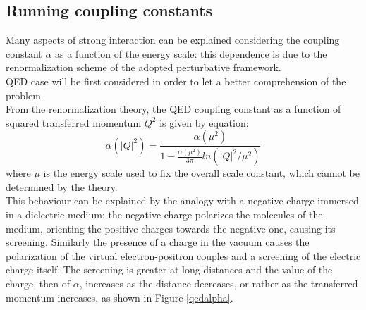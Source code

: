 \subsection{Running coupling constants}
Many aspects of strong interaction can be explained considering the coupling constant $\alpha$ as a function of the energy scale: this dependence is due to the renormalization scheme of the adopted perturbative framework.\\
QED case will be first considered in order to let a better comprehension of the problem.\\
From the renormalization theory, the QED coupling constant as a function of squared transferred momentum $Q^{2}$ is given by equation:
%
\begin{equation}
  \alpha(|Q|^{2})= \frac{ \alpha(\mu^{2})}{1-\frac{\alpha(\mu^{2})}{3\pi}ln(|Q|^{2} / \mu^{2})}
  \label{eq:aqed}
\end{equation}
%
where $\mu$ is the energy scale used to fix the overall scale constant, which cannot be determined by the theory.\\
This behaviour can be explained by the analogy with a negative charge immersed in a dielectric medium: the negative charge polarizes the molecules of the medium, orienting the positive charges towards the negative one, causing its screening. Similarly the presence of a charge in the vacuum causes the polarization of the virtual electron-positron couples and a screening of the electric charge itself. The screening is greater at long distances and the value of the charge, then of $\alpha$, increases as the distance decreases, or rather as the transferred momentum increases, as shown in Figure \ref{qedalpha}.
%
